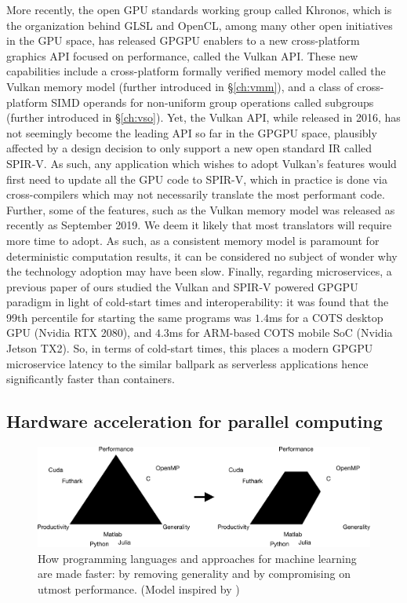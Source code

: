 \documentclass{IEEEtran}
\begin{document}
More recently, the open \gls{GPU} standards working group called Khronos, which is the organization behind \gls{GLSL} and OpenCL, among many other open initiatives in the \gls{GPU} space, has released \gls{GPGPU} enablers to a new cross-platform graphics \gls{API} focused on performance, called the Vulkan \gls{API}. These new capabilities include a cross-platform formally verified memory model called the Vulkan memory model (further introduced in §\ref{ch:vmm}), and a class of cross-platform \gls{SIMD} operands for non-uniform group operations called subgroups (further introduced in §\ref{ch:vso}). Yet, the Vulkan \gls{API}, while released in 2016, has not seemingly become the leading \gls{API} so far in the \gls{GPGPU} space, plausibly affected by a design decision to only support a new open standard \gls{IR} called SPIR-V. As such, any application which wishes to adopt Vulkan's features would first need to update all the \gls{GPU} code to \gls{SPIR-V}, which in practice is done via cross-compilers which may not necessarily translate the most performant code. Further, some of the features, such as the Vulkan memory model was released as recently as September 2019. We deem it likely that most translators will require more time to adopt. As such, as a consistent memory model is paramount for deterministic computation results, it can be considered no subject of wonder why the technology adoption may have been slow. Finally, regarding microservices, a previous paper of ours \cite{haavisto2020interoperable} studied the Vulkan and SPIR-V powered \gls{GPGPU} paradigm in light of cold-start times and interoperability: it was found that the 99th percentile for starting the same programs was $1.4$ms for a \gls{COTS} desktop GPU (Nvidia RTX 2080), and $4.3$ms for ARM-based \gls{COTS} mobile \gls{SoC} (Nvidia Jetson TX2). So, in terms of cold-start times, this places a modern \gls{GPGPU} microservice latency to the similar ballpark as serverless applications hence significantly faster than containers.

\subsection{Hardware acceleration for parallel computing}

\begin{figure}
  \centering
  \includegraphics[width=\columnwidth*2]{tric}
  \caption{How programming languages and approaches for machine learning are made faster: by removing generality and by compromising on utmost performance. (Model inspired by \cite{brown2011heterogeneous})}
  \label{fig:tri0}
\end{figure}
\end{document}
